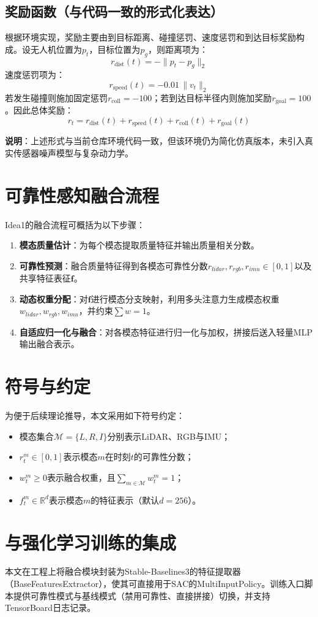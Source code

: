 \subsection{奖励函数（与代码一致的形式化表达）}
根据环境实现，奖励主要由到目标距离、碰撞惩罚、速度惩罚和到达目标奖励构成。设无人机位置为$p_t$，目标位置为$p_g$，则距离项为：
\begin{equation}
r_{\text{dist}}(t) = -\lVert p_t - p_g \rVert_2
\end{equation}
速度惩罚项为：
\begin{equation}
r_{\text{speed}}(t) = -0.01\,\lVert v_t \rVert_2
\end{equation}
若发生碰撞则施加固定惩罚$r_{\text{coll}}=-100$；若到达目标半径内则施加奖励$r_{\text{goal}}=100$。因此总体奖励：
\begin{equation}
r_t = r_{\text{dist}}(t) + r_{\text{speed}}(t) + r_{\text{coll}}(t) + r_{\text{goal}}(t)
\end{equation}

\textbf{说明}：上述形式与当前仓库环境代码一致，但该环境仍为简化仿真版本，未引入真实传感器噪声模型与复杂动力学。

\section{可靠性感知融合流程}
Idea1的融合流程可概括为以下步骤：
\begin{enumerate}
    \item \textbf{模态质量估计}：为每个模态提取质量特征并输出质量相关分数。
    \item \textbf{可靠性预测}：融合质量特征得到各模态可靠性分数$r_{lidar}, r_{rgb}, r_{imu}\in[0,1]$以及共享特征表征$\mathbf{f}$。
    \item \textbf{动态权重分配}：对$\mathbf{f}$进行模态分支映射，利用多头注意力生成模态权重$w_{lidar}, w_{rgb}, w_{imu}$，并约束$\sum w=1$。
    \item \textbf{自适应归一化与融合}：对各模态特征进行归一化与加权，拼接后送入轻量MLP输出融合表示。
\end{enumerate}

\section{符号与约定}
为便于后续理论推导，本文采用如下符号约定：
\begin{itemize}
    \item 模态集合$\mathcal{M}=\{L,R,I\}$分别表示LiDAR、RGB与IMU；
    \item $r_t^m \in [0,1]$表示模态$m$在时刻$t$的可靠性分数；
    \item $w_t^m \ge 0$表示融合权重，且$\sum_{m\in\mathcal{M}} w_t^m = 1$；
    \item $f_t^m \in \mathbb{R}^{d}$表示模态$m$的特征表示（默认$d=256$）。
\end{itemize}

\section{与强化学习训练的集成}
本文在工程上将融合模块封装为Stable-Baselines3的特征提取器（BaseFeaturesExtractor），使其可直接用于SAC的MultiInputPolicy。训练入口脚本提供可靠性模式与基线模式（禁用可靠性、直接拼接）切换，并支持TensorBoard日志记录。
